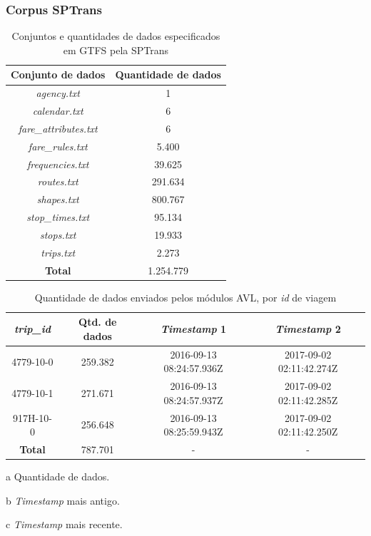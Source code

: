 \documentclass{beamer}
\begin{document}
\begin{frame}
\frametitle{Corpus SPTrans}
\begin{table}[!htb]
\centering
\caption{Conjuntos e quantidades de dados especificados em GTFS pela SPTrans}
	\label{tab:gtfs}
\begin{adjustbox}{max height=15mm}
\begin{tabular}{c|c}
\hline
\textbf{Conjunto de dados} & \textbf {Quantidade de dados} \\ 
\hline
\textit{agency.txt} & 1 \\ 
\hline
\textit{calendar.txt} & 6 \\ 
\hline
\textit{fare\_attributes.txt} & 6 \\ 
\hline
\textit{fare\_rules.txt} & 5.400 \\
\hline
\textit{frequencies.txt} & 39.625 \\
\hline
\textit{routes.txt} & 291.634 \\
\hline
\textit{shapes.txt} & 800.767 \\
\hline
\textit{stop\_times.txt} & 95.134 \\  
\hline
\textit{stops.txt} & 19.933 \\ 
\hline
\textit{trips.txt} & 2.273 \\
\hline
\hline
\textbf{Total} & 1.254.779 \\
\hline
\hline
\end{tabular}
\end{adjustbox}
\end{table}
\begin{table}[!htb]
\centering
\caption{Quantidade de dados enviados pelos módulos AVL, por \textit{id} de viagem}
	\label{tab:tripidQtd}
\begin{adjustbox}{max height=8mm}
\begin{threeparttable}
\begin{tabular}{c|c|c|c}
\hline
\textbf{\textit{trip\_id}} & \textbf {Qtd. de dados \tnote{a}} & \textbf{\textit{Timestamp} 1 \tnote{b}} & \textbf{\textit{Timestamp} 2 \tnote{c}} \\ 
\hline
4779-10-0 & 259.382 & 2016-09-13 08:24:57.936Z & 2017-09-02 02:11:42.274Z \\ 
\hline
4779-10-1 & 271.671 & 2016-09-13 08:24:57.937Z & 2017-09-02 02:11:42.285Z \\ 
\hline
917H-10-0 & 256.648 & 2016-09-13 08:25:59.943Z & 2017-09-02 02:11:42.250Z \\ 
\hline
\hline
\textbf{Total} & 787.701 & - & - \\
\hline
\hline
\end{tabular}
\begin{tablenotes}
            \item[a] Quantidade de dados.
            \item[b] \textit{Timestamp} mais antigo.
            \item[c] \textit{Timestamp} mais recente.
        \end{tablenotes}
\end{threeparttable}
\end{adjustbox}
\end{table}

\end{frame}
\end{document}
